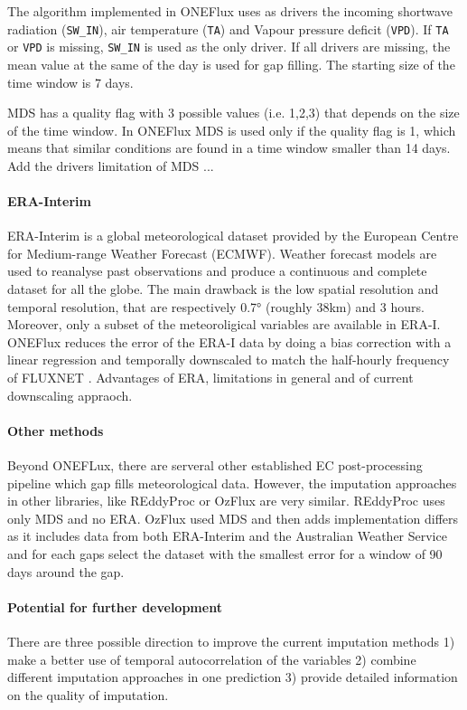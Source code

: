 \documentclass{article}
\begin{document}
The algorithm implemented in ONEFlux uses as drivers the incoming shortwave radiation (\texttt{SW\_IN}), air temperature (\texttt{TA}) and Vapour pressure deficit (\texttt{VPD}). If \texttt{TA} or \texttt{VPD} is missing, \texttt{SW\_IN} is used as the only driver. If all drivers are missing, the mean value at the same of the day is used for gap filling. The starting size of the time window is 7 days.

MDS has a quality flag with 3 possible values (i.e. 1,2,3) that depends on the size of the time window. In ONEFlux MDS is used only if the quality flag is 1, which means that similar conditions are found in a time window smaller than 14 days. Add the drivers
limitation of MDS ...

\paragraph{ERA-Interim} ERA-Interim is a global meteorological dataset provided by the European Centre for Medium-range Weather Forecast (ECMWF). Weather forecast models are used to reanalyse past observations and produce a continuous and complete dataset for all the globe. The main drawback is the low spatial resolution and temporal resolution, that are respectively 0.7° (roughly 38\si{km}) and 3 hours. Moreover, only a subset of the meteoroligical variables are available in ERA-I. ONEFlux reduces the error of the ERA-I data by doing a bias correction with a linear regression and temporally downscaled to match the half-hourly frequency of FLUXNET \cite{vuichard_filling_2015}. 
Advantages of ERA, limitations in general and of current downscaling appraoch.

\paragraph{Other methods} Beyond ONEFLux, there are serveral other established EC post-processing pipeline which gap fills meteorological data. However, the imputation approaches in other libraries, like REddyProc \cite{wutzler_basic_2018} or OzFlux \cite{isaac_ozflux_2017} are very similar. REddyProc uses only MDS and no ERA. OzFlux used MDS and then adds implementation differs as it includes data from both ERA-Interim and the Australian Weather Service and for each gaps select the dataset with the smallest error for a window of 90 days around the gap.
\pagebreak
\paragraph{Potential for further development} There are three possible direction to improve the current imputation methods  1) make a better use of temporal autocorrelation of the variables 2) combine different imputation approaches in one prediction  3) provide detailed information on the quality of imputation.
\end{document}
